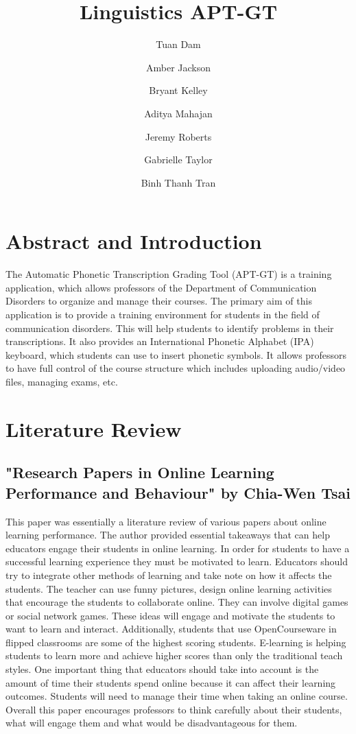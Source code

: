 \documentclass[sigchi]{acmart}
\title{Linguistics APT-GT}
\author{Tuan Dam}
\affiliation{Auburn University}
\author{Amber Jackson}
\affiliation{Auburn University}
\author{Bryant Kelley}
\affiliation{Auburn University}
\author{Aditya Mahajan}
\affiliation{Auburn University}
\author{Jeremy Roberts}
\affiliation{Auburn University}
\author{Gabrielle Taylor}
\affiliation{Auburn University}
\author{Binh Thanh Tran}
\affiliation{Auburn University}
\begin{document}
	\maketitle
	
	\renewcommand{\shortauthors}{Dam et al.}

	\section{Abstract and Introduction}
		The Automatic Phonetic Transcription Grading Tool (APT-GT) is a training application, which allows professors of the Department of Communication Disorders to organize and manage their courses. The primary aim of this application is to provide a training environment for students in the field of communication disorders. This will help students to identify problems in their transcriptions. It also provides an International Phonetic Alphabet (IPA) keyboard, which students can use to insert phonetic symbols. It allows professors to have full control of the course structure which includes uploading audio/video files, managing exams, etc.
	\section{Literature Review}
		\subsection{"Research Papers in Online Learning Performance and Behaviour" by Chia-Wen Tsai}
			This paper was essentially a literature review of various papers about online learning performance. The author provided essential takeaways that can help educators engage their students in online learning. In order for students to have a successful learning experience they must be motivated to learn. Educators should try to integrate other methods of learning and take note on how it affects the students. The teacher can use funny pictures, design online learning activities that encourage the students to collaborate online. They can involve digital games or social network games. These ideas will engage and motivate the students to want to learn and interact. Additionally, students that use OpenCourseware in flipped classrooms are some of the highest scoring students. E-learning is helping students to learn more and achieve higher scores than only the traditional teach styles. One important thing that educators should take into account is the amount of time their students spend online because it can affect their learning outcomes. Students will need to manage their time when taking an online course. Overall this paper encourages professors to think carefully about their students, what will engage them and what would be disadvantageous for them.
\end{document}
